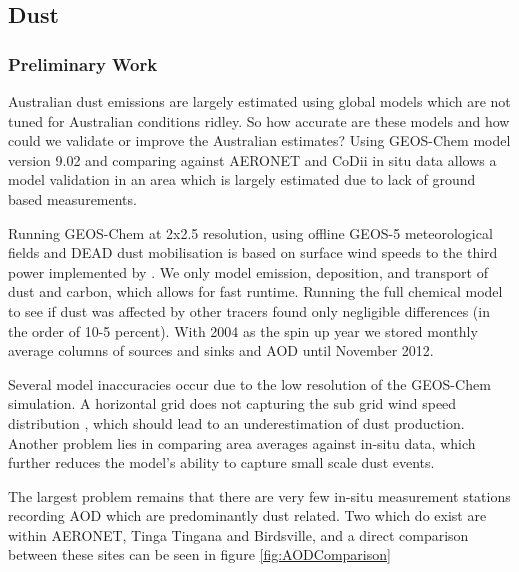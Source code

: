 \subsection{Dust}
\subsubsection{Preliminary Work}
Australian dust emissions are largely estimated using global models which are not tuned for Australian conditions ridley\cite{Ridley_2013,Duncan_Fairlie_2007}.
So how accurate are these models and how could we validate or improve the Australian estimates?
Using GEOS-Chem model version 9.02 and comparing against AERONET and CoDii in situ data allows a model validation in an area which is largely estimated due to lack of ground based measurements.

Running GEOS-Chem at 2x2.5 resolution, using offline GEOS-5 meteorological fields and DEAD dust mobilisation is based on surface wind speeds to the third power implemented by \citet{Duncan_Fairlie_2007}. 
We only model emission, deposition, and transport of dust and carbon, which allows for fast runtime. Running the full chemical model to see if dust was affected by other tracers found only negligible differences (in the order of 10-5 percent).
With 2004 as the spin up year we stored monthly average columns of sources and sinks and AOD until November 2012.

Several model inaccuracies occur due to the low resolution of the GEOS-Chem simulation.
A horizontal grid does not capturing the sub grid wind speed distribution \cite{Ridley_2013}, which should lead to an underestimation of dust production.
Another problem lies in comparing area averages against in-situ data, which further reduces the model's ability to capture small scale dust events.

The largest problem remains that there are very few in-situ measurement stations recording AOD which are predominantly dust related.
Two which do exist are within AERONET, Tinga Tingana and Birdsville, and a direct comparison between these sites can be seen in figure \ref{fig:AODComparison}